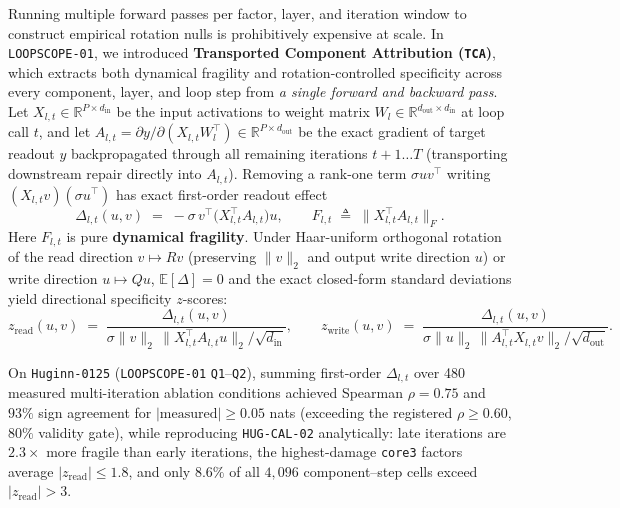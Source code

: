 \documentclass[10pt,letterpaper]{article}
\begin{document}
Running multiple forward passes per factor, layer, and iteration window to construct empirical rotation nulls is prohibitively expensive at scale. In \texttt{LOOPSCOPE-01}, we introduced \textbf{Transported Component Attribution (\texttt{TCA})}, which extracts both dynamical fragility and rotation-controlled specificity across every component, layer, and loop step from \emph{a single forward and backward pass}. Let $X_{l,t} \in \mathbb{R}^{P \times d_{\mathrm{in}}}$ be the input activations to weight matrix $W_l \in \mathbb{R}^{d_{\mathrm{out}} \times d_{\mathrm{in}}}$ at loop call $t$, and let $A_{l,t} = \partial y / \partial (X_{l,t} W_l^\top) \in \mathbb{R}^{P \times d_{\mathrm{out}}}$ be the exact gradient of target readout $y$ backpropagated through all remaining iterations $t+1 \dots T$ (transporting downstream repair directly into $A_{l,t}$). Removing a rank-one term $\sigma u v^\top$ writing $(X_{l,t} v)(\sigma u^\top)$ has exact first-order readout effect
\begin{equation}
  \Delta_{l,t}(u,v) \;=\; - \sigma \, v^\top \bigl(X_{l,t}^\top A_{l,t}\bigr) u,
  \qquad
  F_{l,t} \;\triangleq\; \bigl\| X_{l,t}^\top A_{l,t} \bigr\|_F.
  \label{eq:tca}
\end{equation}
Here $F_{l,t}$ is pure \textbf{dynamical fragility}. Under Haar-uniform orthogonal rotation of the read direction $v \mapsto Rv$ (preserving $\|v\|_2$ and output write direction $u$) or write direction $u \mapsto Q u$, $\mathbb{E}[\Delta] = 0$ and the exact closed-form standard deviations yield directional specificity $z$-scores:
\begin{equation}
  z_{\mathrm{read}}(u,v) \;=\; \frac{\Delta_{l,t}(u,v)}{\sigma \|v\|_2 \, \|X_{l,t}^\top A_{l,t} u\|_2 / \sqrt{d_{\mathrm{in}}}},
  \qquad
  z_{\mathrm{write}}(u,v) \;=\; \frac{\Delta_{l,t}(u,v)}{\sigma \|u\|_2 \, \|A_{l,t}^\top X_{l,t} v\|_2 / \sqrt{d_{\mathrm{out}}}}.
  \label{eq:tca_z}
\end{equation}

On \texttt{Huginn-0125} (\texttt{LOOPSCOPE-01} \texttt{Q1}--\texttt{Q2}), summing first-order $\Delta_{l,t}$ over 480 measured multi-iteration ablation conditions achieved Spearman $\rho = 0.75$ and $93\%$ sign agreement for $|\text{measured}| \ge 0.05$ nats (exceeding the registered $\rho \ge 0.60$, $80\%$ validity gate), while reproducing \texttt{HUG-CAL-02} analytically: late iterations are $2.3\times$ more fragile than early iterations, the highest-damage \texttt{core3} factors average $|z_{\mathrm{read}}| \le 1.8$, and only $8.6\%$ of all $4{,}096$ component--step cells exceed $|z_{\mathrm{read}}| > 3$.
\end{document}
